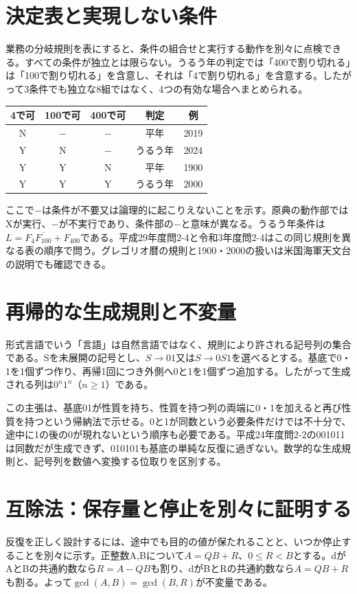 \section{決定表と実現しない条件}
\label{theory:information:decision}
業務の分岐規則を表にすると、条件の組合せと実行する動作を別々に点検できる。すべての条件が独立とは限らない。うるう年の判定では「400で割り切れる」は「100で割り切れる」を含意し、それは「4で割り切れる」を含意する。したがって3条件でも独立な8組ではなく、4つの有効な場合へまとめられる。

\begin{center}
\begin{tabular}{ccc|c|c}
4で可 & 100で可 & 400で可 & 判定 & 例\\\hline
N&−&−&平年&2019\\
Y&N&−&うるう年&2024\\
Y&Y&N&平年&1900\\
Y&Y&Y&うるう年&2000
\end{tabular}
\end{center}

ここで−は条件が不要又は論理的に起こりえないことを示す。原典の動作部ではXが実行、−が不実行であり、条件部の−と意味が異なる。うるう年条件は\(L=F_4\overline{F_{100}}+F_{400}\)である。平成29年度問2-4と令和3年度問2-4はこの同じ規則を異なる表の順序で問う。グレゴリオ暦の規則と1900・2000の扱いは米国海軍天文台の説明でも確認できる\cite{usno_leap_years}。

\section{再帰的な生成規則と不変量}
\label{theory:information:grammar}
形式言語でいう「言語」は自然言語ではなく、規則により許される記号列の集合である。Sを未展開の記号とし、\(S\to01\)又は\(S\to0S1\)を選べるとする。基底で0・1を1個ずつ作り、再帰1回につき外側へ0と1を1個ずつ追加する。したがって生成される列は\(0^n1^n\)（\(n\ge1\)）である。

この主張は、基底01が性質を持ち、性質を持つ列の両端に0・1を加えると再び性質を持つという帰納法で示せる。0と1が同数という必要条件だけでは不十分で、途中に1の後の0が現れないという順序も必要である。平成24年度問2-2の001011は同数だが生成できず、010101も基底の単純な反復に過ぎない。数学的な生成規則と、記号列を数値へ変換する位取りを区別する。

\section{互除法：保存量と停止を別々に証明する}
\label{theory:information:euclid}
反復を正しく設計するには、途中でも目的の値が保たれることと、いつか停止することを別々に示す。正整数A,Bについて\(A=QB+R\)、\(0\le R<B\)とする。dがAとBの共通約数なら\(R=A-QB\)も割り、dがBとRの共通約数なら\(A=QB+R\)も割る。よって\(\gcd(A,B)=\gcd(B,R)\)が不変量である。

